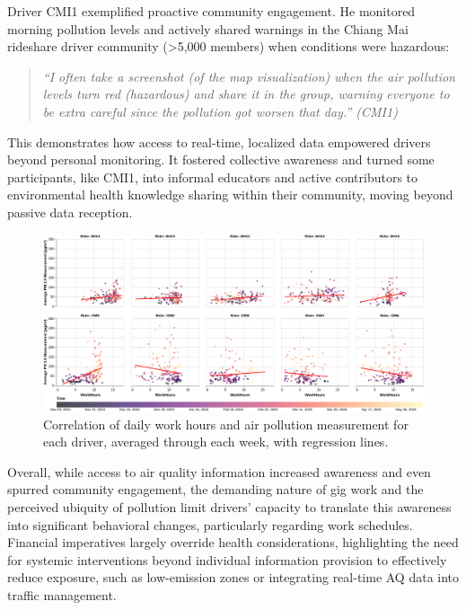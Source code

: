 Driver CMI1 exemplified proactive community engagement.
He monitored morning pollution levels and actively shared warnings in the Chiang Mai rideshare driver community (>5,000 members) when conditions were hazardous:

\begin{quote}
  \em
 ``I often take a screenshot (of the map visualization) when the air pollution levels turn red (hazardous) and share it in the group, warning everyone to be extra careful since the pollution got worsen that day.'' (CMI1)
\end{quote}

This demonstrates how access to real-time, localized data empowered drivers beyond personal monitoring.
It fostered collective awareness and turned some participants, like CMI1, into informal educators and active contributors to environmental health knowledge sharing within their community, moving beyond passive data reception.

\begin{figure}
    \centering
    \includegraphics[width=\textwidth]{figures/work-hours-vs-aqi-per-rider-regression.pdf}
    \caption{Correlation of daily work hours and air pollution measurement for each driver, averaged through each week, with regression lines.
    }
    \Description{}
    \label{fig:work-hours-vs-aqi-per-rider}
\end{figure}

Overall, while access to air quality information increased awareness and even spurred community engagement, the demanding nature of gig work and the perceived ubiquity of pollution limit drivers' capacity to translate this awareness into significant behavioral changes, particularly regarding work schedules.
Financial imperatives largely override health considerations, highlighting the need for systemic interventions beyond individual information provision to effectively reduce exposure, such as low-emission zones or integrating real-time AQ data into traffic management.